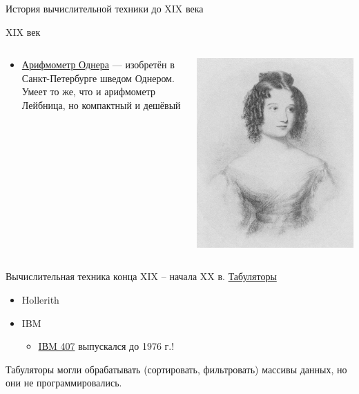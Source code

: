 \documentclass[xetex,aspectratio=43]{beamer}
\begin{document}
\begin{frame}{История вычислительной техники до XIX века}
\begin{block}{XIX век}
\begin{columns}
\begin{column}{0.7\textwidth}
\begin{itemize}
				\item
				\href{https://en.wikipedia.org/wiki/Odhner_Arithmometer}{Арифмометр
					Однера} --- изобретён в Санкт-Петербурге шведом Однером. Умеет то же,
				что и арифмометр Лейбница, но компактный и дешёвый
			\end{itemize}
		\end{column}
		\begin{column}{0.3\textwidth}
			\includegraphics[width=\textwidth]{img/02.Ada_Byron_aged_seventeen_1832.jpg}
		\end{column}
		\end{columns}
	\end{block}
\end{frame}

\begin{frame}{Вычислительная техника конца XIX -- начала XX в.}
	\href{https://en.wikipedia.org/wiki/Tabulating_machine}{Табуляторы}

	\begin{itemize}
		\item
		Hollerith
		\item
		IBM

		\begin{itemize}
			\item
			\href{https://en.wikipedia.org/wiki/IBM_407}{IВM 407} выпускался до
			1976 г.!
		\end{itemize}
	\end{itemize}

	Табуляторы могли обрабатывать (сортировать, фильтровать) массивы данных,
	но они не программировались.
\end{frame}
\end{document}
